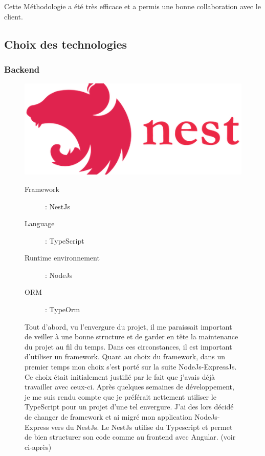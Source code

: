 \newpara

Cette Méthodologie a été très efficace et a permis une bonne collaboration avec le client. 

\subsection{Choix des technologies}
\subsubsection{Backend}
\begin{figure}[H]
  \begin{minipage}{.3\textwidth}
    \includegraphics[width=0.75\linewidth]{img/tech/NestJs.png} 
  \end{minipage}
  \begin{minipage}{.7\textwidth}
    \begin{description}
      \item[Framework]: NestJs
      \item[Language]: TypeScript
      \item[Runtime environnement]: NodeJs  
      \item[ORM]: TypeOrm 
    \end{description}
    Tout d'abord, vu l'envergure du projet, il me paraissait important de veiller à une bonne structure et de garder en tête la maintenance du projet au fil du temps. Dans ces circonstances, il est important d'utiliser un framework. Quant au choix du framework, dans un premier temps mon choix s'est porté sur la suite NodeJs-ExpressJs. Ce choix était initialement justifié par le fait que j'avais déjà travailler avec ceux-ci. Après quelques semaines de développement, je me suis rendu compte que je préférait nettement utiliser le TypeScript pour un projet d'une tel envergure. J'ai des lors décidé de changer de framework et ai migré mon application NodeJs-Express vers du NestJs. Le NestJs utilise du Typescript et permet de bien structurer son code comme au frontend avec Angular. (voir ci-après)
  \end{minipage}
\end{figure}

